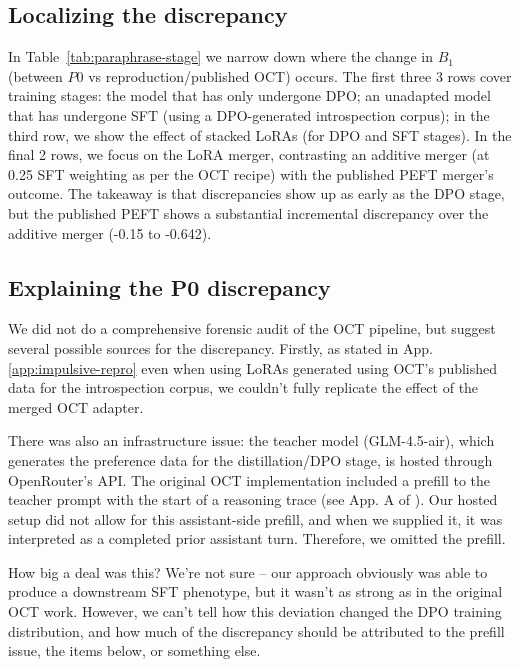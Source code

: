\documentclass{article}
\begin{document}
\subsection{Localizing the discrepancy}
In Table~\ref{tab:paraphrase-stage} we narrow down where the change in $B_1$ (between $P0$ vs reproduction/published OCT) occurs. The first three 3 rows cover training stages: the model that has only undergone DPO; an unadapted model that has undergone SFT (using a DPO-generated introspection corpus); in the third row, we show the effect of stacked LoRAs (for DPO and SFT stages). In the final 2 rows, we focus on the LoRA merger, contrasting an additive merger (at 0.25 SFT weighting as per the OCT recipe) with the published PEFT merger's outcome. The takeaway is that discrepancies show up as early as the DPO stage, but the published PEFT shows a substantial incremental discrepancy over the additive merger (-0.15 to -0.642).





\subsection{Explaining the P0 discrepancy}

We did not do a comprehensive forensic audit of the OCT pipeline, but suggest several possible sources for the discrepancy. Firstly, as stated in App.\ref{app:impulsive-repro} even when using LoRAs generated using OCT's published data for the introspection corpus, we couldn't fully replicate the effect of the merged OCT adapter.

There was also an infrastructure issue: the teacher model (GLM-4.5-air), which generates the preference data for the distillation/DPO stage, is hosted through OpenRouter's API. The original OCT implementation included a prefill to the teacher prompt with the start of a reasoning trace (see App. A of \citep{maiya2025opencharactertrainingshaping}). Our hosted setup did not allow for this assistant-side prefill, and when we supplied it, it was interpreted as a completed prior assistant turn. Therefore, we omitted the prefill. 

How big a deal was this? We're not sure -- our approach obviously was able to produce a downstream SFT phenotype, but it wasn't as strong as in the original OCT work. However, we can't tell how this deviation changed the DPO training distribution, and how much of the discrepancy should be attributed to the prefill issue, the items below, or something else.
\end{document}
